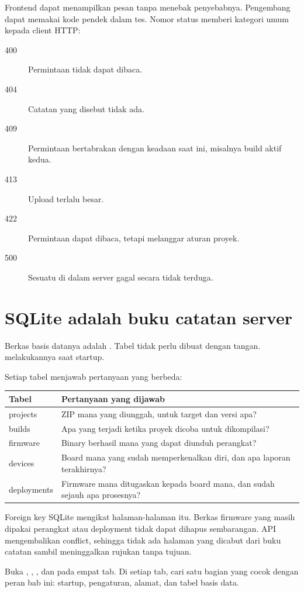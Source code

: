 Frontend dapat menampilkan pesan tanpa menebak penyebabnya. Pengembang dapat memakai kode pendek dalam tes. Nomor status memberi kategori umum kepada client HTTP:

\begin{description}
  \item[400] Permintaan tidak dapat dibaca.
  \item[404] Catatan yang disebut tidak ada.
  \item[409] Permintaan bertabrakan dengan keadaan saat ini, misalnya build aktif kedua.
  \item[413] Upload terlalu besar.
  \item[422] Permintaan dapat dibaca, tetapi melanggar aturan proyek.
  \item[500] Sesuatu di dalam server gagal secara tidak terduga.
\end{description}

\section{SQLite adalah buku catatan server}

Berkas basis datanya adalah . Tabel tidak perlu dibuat dengan tangan.  melakukannya saat startup.

Setiap tabel menjawab pertanyaan yang berbeda:

\begin{longtable}{p{}p{}}
\toprule
Tabel & Pertanyaan yang dijawab\\
\midrule
\endhead
projects & ZIP mana yang diunggah, untuk target dan versi apa?\\
builds & Apa yang terjadi ketika proyek dicoba untuk dikompilasi?\\
firmware & Binary berhasil mana yang dapat diunduh perangkat?\\
devices & Board mana yang sudah memperkenalkan diri, dan apa laporan terakhirnya?\\
deployments & Firmware mana ditugaskan kepada board mana, dan sudah sejauh apa prosesnya?\\
\bottomrule
\end{longtable}

Foreign key SQLite mengikat halaman-halaman itu. Berkas firmware yang masih dipakai perangkat atau deployment tidak dapat dihapus sembarangan. API mengembalikan conflict, sehingga tidak ada halaman yang dicabut dari buku catatan sambil meninggalkan rujukan tanpa tujuan.

\begin{checkpoint}
Buka , , , dan  pada empat tab. Di setiap tab, cari satu bagian yang cocok dengan peran bab ini: startup, pengaturan, alamat, dan tabel basis data.
\end{checkpoint}
